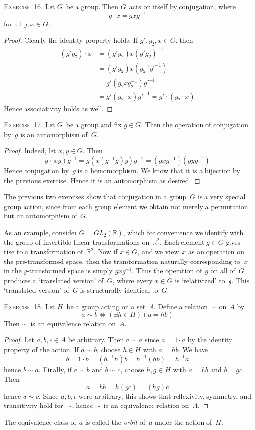\documentclass[letterpaper]{article}
\newcommand{\exercise}[1]{\goodbreak\noindent\textsc{Exercise~{#1}.}}
\newcommand{\R}{\mathbb{R}}
\begin{document}
\exercise{16}
Let $G$~be a group. Then $G$~acts on itself by conjugation, where
$$g\cdot x=gxg^{-1}$$
for all $g,x\in G$.
\begin{proof}
Clearly the identity property holds. If $g',g_2,x\in G$, then
\begin{align*}
(g'g_2)\cdot x&=(g'g_2)x(g'g_2)^{-1}\\
	&=(g'g_2)x(g_2^{-1}g'^{-1})\\
	&=g'(g_2 x g_2^{-1})g'^{-1}\\
	&=g'(g_2\cdot x)g'^{-1}=g'\cdot(g_2\cdot x)
\end{align*}
Hence associativity holds as well.
\end{proof}

\exercise{17}
Let $G$~be a group and fix $g\in G$. Then the operation of conjugation by~$g$ is an automorphism of~$G$.
\begin{proof}
Indeed, let $x,y\in G$. Then
$$g(xy)g^{-1}=g(x(g^{-1}g)y)g^{-1}=(gxg^{-1})(gyg^{-1})$$
Hence conjugation by~$g$ is a homomorphism. We know that it is a bijection by the previous exercise. Hence it is an automorphism as desired.
\end{proof}
\noindent The previous two exercises show that conjugation in a group~$G$ is a very special group action, since from each group element we obtain not merely a permutation but an automorphism of~$G$.

As an example, consider $G=GL_2(\R)$, which for convenience we identify with the group of invertible linear transformations on~$\R^2$. Each element $g\in G$ gives rise to a transformation of~$\R^2$. Now if $x\in G$, and we view~$x$ as an operation on the pre-transformed space, then the transformation naturally corresponding to~$x$ in the $g$-transformed space is simply $gxg^{-1}$. Thus the operation of~$g$ on all of~$G$ produces a `translated version' of~$G$, where every $x\in G$ is `relativized' to~$g$. This `translated version' of~$G$ is structurally identical to~$G$.

\bigskip
\exercise{18}
Let $H$~be a group acting on a set~$A$. Define a relation~$\sim$ on~$A$ by
$$a\sim b\iff(\exists h\in H)(a=hb)$$
Then $\sim$~is an equivalence relation on~$A$.
\begin{proof}
Let $a,b,c\in A$ be arbitrary. Then $a\sim a$ since $a=1\cdot a$ by the identity property of the action. If $a\sim b$, choose $h\in H$ with $a=hb$. We have
$$b=1\cdot b=(h^{-1}h)b=h^{-1}(hb)=h^{-1}a$$
hence $b\sim a$. Finally, if $a\sim b$ and $b\sim c$, choose $h,g\in H$ with $a=hb$ and $b=gc$. Then
$$a=hb=h(gc)=(hg)c$$
hence $a\sim c$. Since $a,b,c$ were arbitrary, this shows that reflexivity, symmetry, and transitivity hold for~$\sim$, hence $\sim$~is an equivalence relation on~$A$.
\end{proof}
\noindent The equivalence class of~$a$ is called the \emph{orbit} of~$a$ under the action of~$H$.
\end{document}
